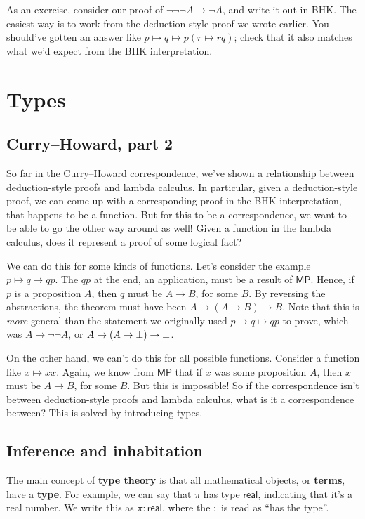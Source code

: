 \documentclass[11pt,paper=letter]{scrartcl}
\renewcommand{\sf}{\mathsf}
\renewcommand{\lnot}{\neg}
\begin{document}
As an exercise, consider our proof of $\lnot\lnot\lnot A \to \lnot A$, and write it out in BHK. The easiest way is to work from the deduction-style proof we wrote earlier. You should've gotten an answer like $p \mapsto q \mapsto p(r \mapsto rq)$; check that it also matches what we'd expect from the BHK interpretation.

\clearpage

\section{Types}

\subsection{Curry--Howard, part 2}

So far in the Curry--Howard correspondence, we've shown a relationship between deduction-style proofs and lambda calculus. In particular, given a deduction-style proof, we can come up with a corresponding proof in the BHK interpretation, that happens to be a function. But for this to be a correspondence, we want to be able to go the other way around as well! Given a function in the lambda calculus, does it represent a proof of some logical fact?

We can do this for some kinds of functions. Let's consider the example $p \mapsto q \mapsto qp$. The $qp$ at the end, an application, must be a result of $\sf{MP}$. Hence, if $p$ is a proposition $A$, then $q$ must be $A \to B$, for some $B$. By reversing the abstractions, the theorem must have been $A \to (A \to B) \to B$. Note that this is \emph{more} general than the statement we originally used $p \mapsto q \mapsto qp$ to prove, which was $A \to \lnot\lnot A$, or $A \to (A \to \bot) \to \bot$.

On the other hand, we can't do this for all possible functions. Consider a function like $x \mapsto xx$. Again, we know from $\sf{MP}$ that if $x$ was some proposition $A$, then $x$ must be $A \to B$, for some $B$. But this is impossible! So if the correspondence isn't between deduction-style proofs and lambda calculus, what is it a correspondence between? This is solved by introducing types.

\subsection{Inference and inhabitation}

The main concept of \textbf{type theory} is that all mathematical objects, or \textbf{terms}, have a \textbf{type}. For example, we can say that $\pi$ has type $\sf{real}$, indicating that it's a real number. We write this as $\pi : \sf{real}$, where the $:$ is read as ``has the type''.
\end{document}
